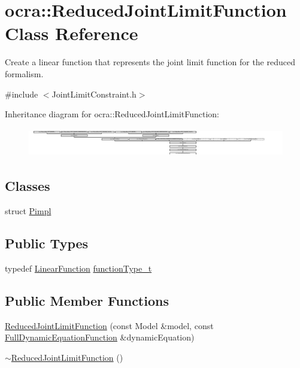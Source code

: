 \hypertarget{classocra_1_1ReducedJointLimitFunction}{}\section{ocra\+:\+:Reduced\+Joint\+Limit\+Function Class Reference}
\label{classocra_1_1ReducedJointLimitFunction}


Create a linear function that represents the joint limit function for the reduced formalism.  




{\ttfamily \#include $<$Joint\+Limit\+Constraint.\+h$>$}

Inheritance diagram for ocra\+:\+:Reduced\+Joint\+Limit\+Function\+:\begin{figure}[H]
\begin{center}
\leavevmode
\includegraphics[height=1.262480cm]{dc/daa/classocra_1_1ReducedJointLimitFunction}
\end{center}
\end{figure}
\subsection*{Classes}
\begin{DoxyCompactItemize}
\item 
struct \hyperlink{structReducedJointLimitFunction_1_1Pimpl}{Pimpl}
\end{DoxyCompactItemize}
\subsection*{Public Types}
\begin{DoxyCompactItemize}
\item 
typedef \hyperlink{classocra_1_1LinearFunction}{Linear\+Function} \hyperlink{classocra_1_1ReducedJointLimitFunction_a899e4871502f5e5509349b1f8eb5dfa8}{function\+Type\+\_\+t}
\end{DoxyCompactItemize}
\subsection*{Public Member Functions}
\begin{DoxyCompactItemize}
\item 
\hyperlink{classocra_1_1ReducedJointLimitFunction_afe65f4b9229680de647bb06fd7ae5b44}{Reduced\+Joint\+Limit\+Function} (const Model \&model, const \hyperlink{classocra_1_1FullDynamicEquationFunction}{Full\+Dynamic\+Equation\+Function} \&dynamic\+Equation)
\item 
\hyperlink{classocra_1_1ReducedJointLimitFunction_a96e9196a18c5eb5e92672b45a7491c65}{$\sim$\+Reduced\+Joint\+Limit\+Function} ()
\end{DoxyCompactItemize}
